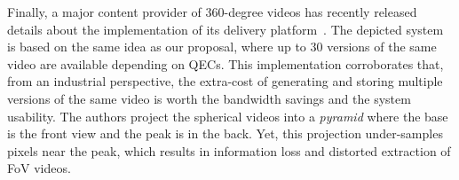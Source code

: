 
Finally, a major content provider of 360-degree videos has recently released details about the
implementation of its delivery platform~\cite{facebook}. The depicted system is based
on the same idea as our proposal, where up to 30 versions of the same video are available depending on
\acp{QEC}. This implementation corroborates that, from an industrial perspective, the
extra-cost of
generating and storing multiple versions of the same video is worth the bandwidth
savings and the system usability. The authors project the spherical videos into a \emph{pyramid}
where the
base is the front
view and the peak is in the back. Yet, this projection under-samples pixels near the peak,
which
results in
information loss and distorted extraction of \ac{FoV} videos. 

%
%
%
%


